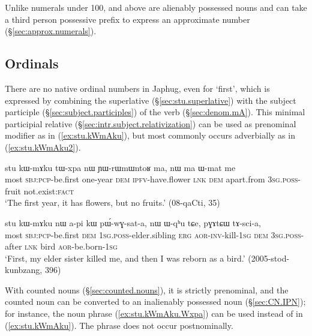 
Unlike numerals under 100,  and above are alienably possessed nouns and can take a third person possessive prefix  to express an approximate number (§\ref{sec:approx.numerals}).

 \subsection{Ordinals} \label{sec:ordinals}
There are no native ordinal numbers in Japhug, even for `first', which is expressed by combining the superlative  (§\ref{sec:stu.superlative}) with the subject participle (§\ref{sec:subject.participles}) of the verb  (§\ref{sec:denom.mA}). This minimal participial relative  (§\ref{sec:intr.subject.relativization}) can be used as prenominal modifier as in (\ref{ex:stu.kWmAku}), but most commonly occurs adverbially as in (\ref{ex:stu.kWmAku2}).   
 
\begin{exe}
\ex  \label{ex:stu.kWmAku}
\gll stu kɯ-mɤku tɯ-xpa nɯ ɲɯ-rɯmɯntoʁ ma, nɯ ma ɯ-mat me \\
most \textsc{sbj}:\textsc{pcp}-be.first one-year \textsc{dem} \textsc{ipfv}-have.flower \textsc{lnk} \textsc{dem} apart.from \textsc{3sg}.\textsc{poss}-fruit not.exist:\textsc{fact} \\
\glt `The first year, it has flowers, but no fruits.' (08-qaCti, 35)
\end{exe}
  
\begin{exe}
\ex  \label{ex:stu.kWmAku2}
\gll stu kɯ-mɤku nɯ a-pi kɯ pɯ́-wɣ-sat-a,  nɯ ɯ-qʰu tɕe, pɣɤtɕɯ tɤ-sci-a, \\
most \textsc{sbj}:\textsc{pcp}-be.first \textsc{dem} \textsc{1sg}.\textsc{poss}-elder.sibling \textsc{erg} \textsc{aor}-\textsc{inv}-kill-\textsc{1sg} \textsc{dem} \textsc{3sg}.\textsc{poss}-after \textsc{lnk} bird \textsc{aor}-be.born-\textsc{1sg} \\
\glt `First, my elder sister killed me, and then I was reborn as a bird.' (2005-stod-kunbzang, 396)
\end{exe}

With counted nouns (§\ref{sec:counted.nouns}), it is strictly prenominal, and the counted noun can be converted to an inalienably possessed noun (§\ref{sec:CN.IPN}); for instance, the noun phrase (\ref{ex:stu.kWmAku.Wxpa}) can be used instead of  in (\ref{ex:stu.kWmAku}). The phrase  does not occur postnominally.

